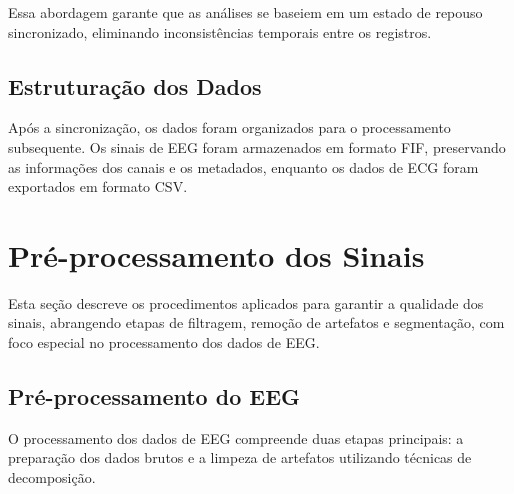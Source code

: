 Essa abordagem garante que as análises se baseiem em um estado de repouso sincronizado, eliminando inconsistências temporais entre os registros.

\subsection{Estruturação dos Dados}
Após a sincronização, os dados foram organizados para o processamento subsequente. Os sinais de EEG foram armazenados em formato FIF, preservando as informações dos canais e os metadados, enquanto os dados de ECG foram exportados em formato CSV.
\section{Pré-processamento dos Sinais}

Esta seção descreve os procedimentos aplicados para garantir a qualidade dos sinais, abrangendo etapas de filtragem, remoção de artefatos e segmentação, com foco especial no processamento dos dados de EEG.

\subsection{Pré-processamento do EEG}

O processamento dos dados de EEG compreende duas etapas principais: a preparação dos dados brutos e a limpeza de artefatos utilizando técnicas de decomposição.


